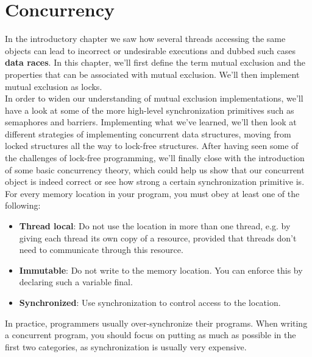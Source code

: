 \documentclass[main]{subfiles}
\begin{document}
\section{Concurrency}
In the introductory chapter we saw how several threads accessing the same objects can lead to incorrect or undesirable executions and dubbed such cases \textbf{data races}. In this chapter, we'll first define the term mutual exclusion and the properties that can be associated with mutual exclusion. We'll then implement mutual exclusion as locks.\\
In order to widen our understanding of mutual exclusion implementations, we'll have a look at some of the more high-level synchronization primitives such as semaphores and barriers. Implementing what we've learned, we'll then look at different strategies of implementing concurrent data structures, moving from locked structures all the way to lock-free structures. After having seen some of the challenges of lock-free programming, we'll finally close with the introduction of some basic concurrency theory, which could help us show that our concurrent object is indeed correct or see how strong a certain synchronization primitive is.\\[3mm]
For every memory location in your program, you must obey at least one of the following:
\begin{itemize}
    \item \textbf{Thread local}: Do not use the location in more than one thread, e.g. by giving each thread its own copy of a resource, provided that threads don't need to communicate through this resource.
    \item \textbf{Immutable}: Do not write to the memory location. You can enforce this by declaring such a variable final.
    \item \textbf{Synchronized}: Use synchronization to control access to the location.
\end{itemize}
In practice, programmers usually over-synchronize their programs. When writing a concurrent program, you should focus on putting as much as possible in the first two categories, as synchronization is usually very expensive.


\end{document}
